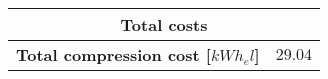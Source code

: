 \begin{table}[]
\centering
\begin{tabular}{cc}
\hline
\multicolumn{2}{c}{\cellcolor{bluepoli!40}\textbf{Total costs}} \\ \hline
\multicolumn{1}{|c|}{\cellcolor{bluepoli!40}\textbf{Total compression cost {[}$kWh_el${]}}}      &
\multicolumn{1}{c|}{$29.04$}          \\ \hline
\end{tabular}
\end{table}